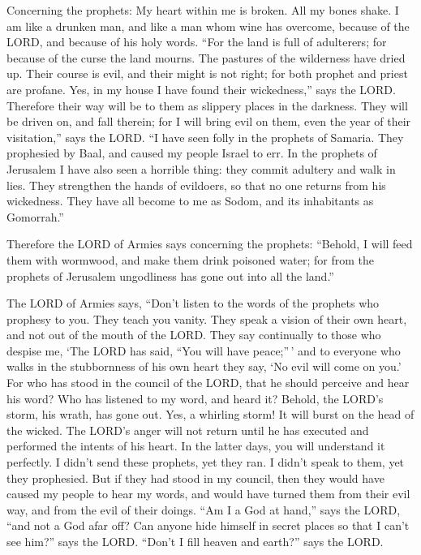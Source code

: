  Concerning the prophets: My heart within me is broken. All
my bones shake. I am like a drunken man, and like a man whom wine has
overcome, because of the LORD, and because of his holy words.
 ``For the land is full of adulterers; for because of the
curse the land mourns. The pastures of the wilderness have dried up.
Their course is evil, and their might is not right;  for
both prophet and priest are profane. Yes, in my house I have found their
wickedness,'' says the LORD.  Therefore their way will be
to them as slippery places in the darkness. They will be driven on, and
fall therein; for I will bring evil on them, even the year of their
visitation,'' says the LORD.  ``I have seen folly in the
prophets of Samaria. They prophesied by Baal, and caused my people
Israel to err.  In the prophets of Jerusalem I have also
seen a horrible thing: they commit adultery and walk in lies. They
strengthen the hands of evildoers, so that no one returns from his
wickedness. They have all become to me as Sodom, and its inhabitants as
Gomorrah.''

 Therefore the LORD of Armies says concerning the prophets:
``Behold, I will feed them with wormwood, and make them drink poisoned
water; for from the prophets of Jerusalem ungodliness has gone out into
all the land.''

 The LORD of Armies says, ``Don't listen to the words of
the prophets who prophesy to you. They teach you vanity. They speak a
vision of their own heart, and not out of the mouth of the LORD.
 They say continually to those who despise me, `The LORD
has said, ``You will have peace;''\,' and to everyone who walks in the
stubbornness of his own heart they say, `No evil will come on you.'
 For who has stood in the council of the LORD, that he
should perceive and hear his word? Who has listened to my word, and
heard it?  Behold, the LORD's storm, his wrath, has gone
out. Yes, a whirling storm! It will burst on the head of the wicked.
 The LORD's anger will not return until he has executed and
performed the intents of his heart. In the latter days, you will
understand it perfectly.  I didn't send these prophets, yet
they ran. I didn't speak to them, yet they prophesied.  But
if they had stood in my council, then they would have caused my people
to hear my words, and would have turned them from their evil way, and
from the evil of their doings.  ``Am I a God at hand,''
says the LORD, ``and not a God afar off?  Can anyone hide
himself in secret places so that I can't see him?'' says the LORD.
``Don't I fill heaven and earth?'' says the LORD.

